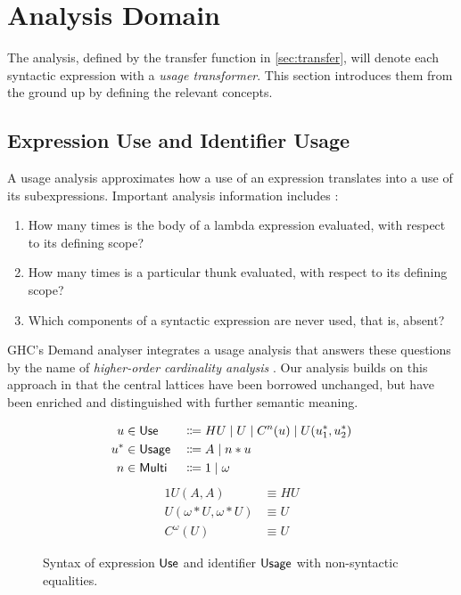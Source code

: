 \section{Analysis Domain}

The analysis, defined by the transfer function in \cref{sec:transfer}, will denote each syntactic expression with a \emph{usage transformer}. 
This section introduces them from the ground up by defining the relevant concepts.

\subsection{Expression Use and Identifier Usage}

A usage analysis approximates how a use of an expression translates into a use of its subexpressions. Important analysis information includes \parencite{card}:

\begin{enumerate}
\item How many times is the body of a lambda expression evaluated, with respect to its defining scope?
\item How many times is a particular thunk evaluated, with respect to its defining scope?
\item Which components of a syntactic expression are never used, that is, absent?
\end{enumerate}

GHC's Demand analyser integrates a usage analysis that answers these questions by the name of \emph{higher-order cardinality analysis} \parencite{card}. 
Our analysis builds on this approach in that the central lattices have been borrowed unchanged, but have been enriched and distinguished with further semantic meaning.

\begin{figure}
\begin{alignat*}{2}
u   &\in \text{\textsf{Use}}   &{} \Coloneqq {}& HU \mid U \mid C^n(u) \mid U(u^*_1, u^*_2) \\
u^* &\in \text{\textsf{Usage}} &{} \Coloneqq {}& A \mid n*u \\
n   &\in \text{\textsf{Multi}} &{} \Coloneqq {}& 1 \mid \omega
\end{alignat*}
\begin{alignat*}{1}
U(A,A)               &\equiv HU \\
U(\omega*U,\omega*U) &\equiv U \\
C^\omega(U)          &\equiv U
\end{alignat*}
\caption{Syntax of expression $\text{\textsf{Use}}$ and identifier $\text{\textsf{Usage}}$ with non-syntactic equalities.}
\label{fig:usg}
\end{figure}

